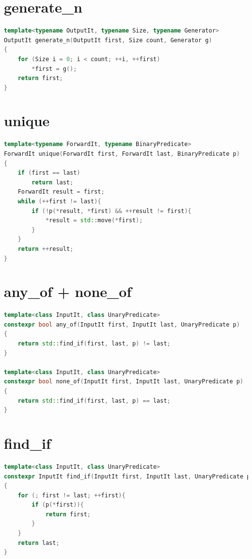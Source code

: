 \documentclass[10pt, oneside]{book}
\begin{document}
\section{generate\_n}
\begin{lstlisting}[language=C++]
template<typename OutputIt, typename Size, typename Generator>
OutputIt generate_n(OutputIt first, Size count, Generator g)
{
    for (Size i = 0; i < count; ++i, ++first)
        *first = g();
    return first;
}
\end{lstlisting}

\section{unique}
\begin{lstlisting}[language=C++]
template<typename ForwardIt, typename BinaryPredicate>
ForwardIt unique(ForwardIt first, ForwardIt last, BinaryPredicate p)
{
    if (first == last)
        return last;
    ForwardIt result = first;
    while (++first != last){
        if (!p(*result, *first) && ++result != first){
            *result = std::move(*first);
        }
    }
    return ++result;
}
\end{lstlisting}

\section{any\_of + none\_of}
\begin{lstlisting}[language=C++]
template<class InputIt, class UnaryPredicate>
constexpr bool any_of(InputIt first, InputIt last, UnaryPredicate p)
{
    return std::find_if(first, last, p) != last;
}

template<class InputIt, class UnaryPredicate>
constexpr bool none_of(InputIt first, InputIt last, UnaryPredicate p)
{
    return std::find_if(first, last, p) == last;
}
\end{lstlisting}

\section{find\_if}
\begin{lstlisting}[language=C++]
template<class InputIt, class UnaryPredicate>
constexpr InputIt find_if(InputIt first, InputIt last, UnaryPredicate p)
{
    for (; first != last; ++first){
        if (p(*first)){
            return first;
        }
    }
    return last;
}
\end{lstlisting}
\end{document}
